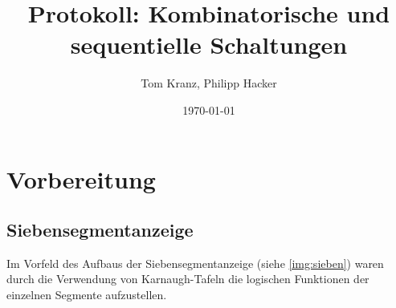 \documentclass[numbers=noenddot,12pt,a4paper]{scrartcl}
\title{Protokoll: Kombinatorische und sequentielle Schaltungen}
\author{Tom Kranz, Philipp Hacker}
\date{\today}
\begin{document}
\maketitle
\vspace*{\fill}
\tableofcontents
\vfill
\newpage
\section{Vorbereitung}
\subsection{Siebensegmentanzeige} \label{sec:sieben}
Im Vorfeld des Aufbaus der Siebensegmentanzeige (siehe \ref{img:sieben}) waren durch die Verwendung von Karnaugh-Tafeln die logischen Funktionen der einzelnen Segmente aufzustellen.
\end{document}
